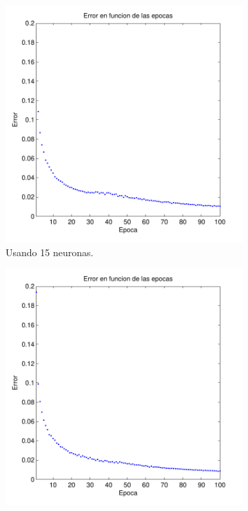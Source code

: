 \documentclass[informe.tex]{subfiles}
\begin{document}
    \begin{figure}[H]
        \centering
        \begin{subfigure}[b]{0.32\textwidth}
                \includegraphics[width=\textwidth]{graficos/error_fold1_15_binary_100_03.pdf}
                \caption{Usando 15 neuronas.}
                \label{fig:d1-f1-03-n15}
        \end{subfigure}
        \begin{subfigure}[b]{0.32\textwidth}
                \includegraphics[width=\textwidth]{graficos/error_fold1_20_binary_100_03.pdf}

\end{subfigure}
\end{figure}
\end{document}
